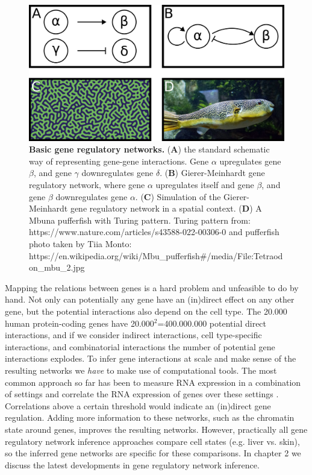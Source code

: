 \begin{figure}[H]
    \center
    \includegraphics[width=0.8\linewidth]{ch.introduction/imgs/network.png}
    \caption{\textbf{Basic gene regulatory networks.} (\textbf{A}) the standard schematic way of representing gene-gene interactions. Gene $\alpha$ upregulates gene $\beta$, and gene $\gamma$ downregulates gene $\delta$. (\textbf{B}) Gierer-Meinhardt gene regulatory network, where gene $\alpha$ upregulates itself and gene $\beta$, and gene $\beta$ downregulates gene $\alpha$. (\textbf{C}) Simulation of the Gierer-Meinhardt gene regulatory network in a spatial context. (\textbf{D}) A Mbuna pufferfish with Turing pattern. Turing pattern from: https://www.nature.com/articles/s43588-022-00306-0 and pufferfish photo taken by Tiia Monto: https://en.wikipedia.org/wiki/Mbu\_pufferfish\#/media/File:Tetraodon\_mbu\_2.jpg}
    \label{fig:network}
\end{figure}

Mapping the relations between genes is a hard problem and unfeasible to do by hand. Not only can potentially any gene have an (in)direct effect on any other gene, but the potential interactions also depend on the cell type. The 20.000 human protein-coding genes have 20.000$^2$=400.000.000 potential direct interactions, and if we consider indirect interactions, cell type-specific interactions, and combinatorial interactions the number of potential gene interactions explodes. To infer gene interactions at scale and make sense of the resulting networks we \textit{have} to make use of computational tools. The most common approach so far has been to measure RNA expression in a combination of settings and correlate the RNA expression of genes over these settings \cite{Zhang_2005,Margolin_2006}. Correlations above a certain threshold would indicate an (in)direct gene regulation. Adding more information to these networks, such as the chromatin state around genes\cite{Xu_2020,Kamal_2021}, improves the resulting networks. However, practically all gene regulatory network inference approaches compare cell states (e.g. liver vs. skin), so the inferred gene networks are specific for these comparisons. In chapter 2 we discuss the latest developments in gene regulatory network inference.

